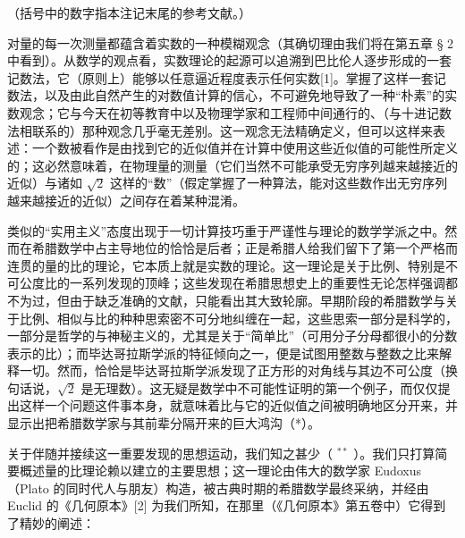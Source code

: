 
（括号中的数字指本注记末尾的参考文献。）

对量的每一次测量都蕴含着实数的一种模糊观念（其确切理由我们将在第五章 § 2 中看到）。从数学的观点看，实数理论的起源可以追溯到巴比伦人逐步形成的一套记数法，它（原则上）能够以任意逼近程度表示任何实数{[}1{]}。掌握了这样一套记数法，以及由此自然产生的对数值计算的信心，不可避免地导致了一种“朴素”的实数观念；它与今天在初等教育中以及物理学家和工程师中间通行的、（与十进记数法相联系的）那种观念几乎毫无差别。这一观念无法精确定义，但可以这样来表述：一个数被看作是由找到它的近似值并在计算中使用这些近似值的可能性所定义的；这必然意味着，在物理量的测量（它们当然不可能承受无穷序列越来越接近的近似）与诸如 \(\sqrt{2}\) 这样的“数”（假定掌握了一种算法，能对这些数作出无穷序列越来越接近的近似）之间存在着某种混淆。

类似的“实用主义”态度出现于一切计算技巧重于严谨性与理论的数学学派之中。然而在希腊数学中占主导地位的恰恰是后者；正是希腊人给我们留下了第一个严格而连贯的量的比的理论，它本质上就是实数的理论。这一理论是关于比例、特别是不可公度比的一系列发现的顶峰；这些发现在希腊思想史上的重要性无论怎样强调都不为过，但由于缺乏准确的文献，只能看出其大致轮廓。早期阶段的希腊数学与关于比例、相似与比的种种思索密不可分地纠缠在一起，这些思索一部分是科学的，一部分是哲学的与神秘主义的，尤其是关于“简单比”（可用分子分母都很小的分数表示的比）；而毕达哥拉斯学派的特征倾向之一，便是试图用整数与整数之比来解释一切。然而，恰恰是毕达哥拉斯学派发现了正方形的对角线与其边不可公度（换句话说，\(\sqrt{2}\) 是无理数）。这无疑是数学中不可能性证明的第一个例子，而仅仅提出这样一个问题这件事本身，就意味着比与它的近似值之间被明确地区分开来，并显示出把希腊数学家与其前辈分隔开来的巨大鸿沟（*）。

关于伴随并接续这一重要发现的思想运动，我们知之甚少（ \(^{**}\) ）。我们只打算简要概述量的比理论赖以建立的主要思想；这一理论由伟大的数学家 Eudoxus（Plato 的同时代人与朋友）构造，被古典时期的希腊数学最终采纳，并经由 Euclid 的《几何原本》{[}2{]} 为我们所知，在那里（《几何原本》第五卷中）它得到了精妙的阐述：

